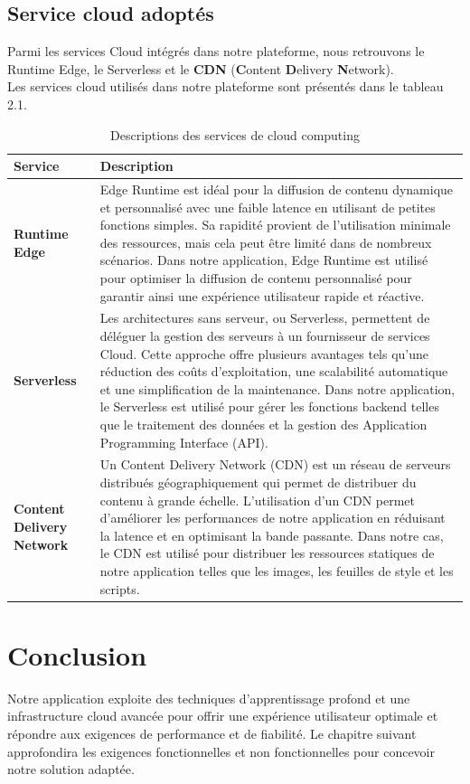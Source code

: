 \subsection{Service cloud adoptés }
\justifying
Parmi les services Cloud intégrés dans notre plateforme, nous retrouvons le Runtime Edge, le Serverless et le \textbf{CDN} (\textbf{C}ontent \textbf{D}elivery \textbf{N}etwork).\\
Les services cloud utilisés dans notre plateforme sont présentés dans le tableau 2.1.


\begin{table}[H]
    \centering
    \caption{Descriptions des services de cloud computing}
    \begin{tabular}{|>{\RaggedRight\arraybackslash}p{4cm}|>{\RaggedRight\arraybackslash}p{10cm}|}
        \hline
        \textbf{Service} & \textbf{Description} \\
        \hline
        \textbf{Runtime Edge} & Edge Runtime est idéal pour la diffusion de contenu dynamique et personnalisé avec une faible latence en utilisant de petites fonctions simples. Sa rapidité provient de l'utilisation minimale des ressources, mais cela peut être limité dans de nombreux scénarios. Dans notre application, Edge Runtime est utilisé pour optimiser la diffusion de contenu personnalisé pour garantir ainsi une expérience utilisateur rapide et réactive. \\
        \hline
        \textbf{Serverless} & Les architectures sans serveur, ou Serverless, permettent de déléguer la gestion des serveurs à un fournisseur de services Cloud. Cette approche offre plusieurs avantages tels qu'une réduction des coûts d'exploitation, une scalabilité automatique et une simplification de la maintenance. Dans notre application, le Serverless est utilisé pour gérer les fonctions backend telles que le traitement des données et la gestion des Application Programming Interface (API). \\
        \hline
        \textbf{Content Delivery Network} & Un Content Delivery Network (CDN) est un réseau de serveurs distribués géographiquement qui permet de distribuer du contenu à grande échelle. L'utilisation d'un CDN permet d'améliorer les performances de notre application en réduisant la latence et en optimisant la bande passante. Dans notre cas, le CDN est utilisé pour distribuer les ressources statiques de notre application telles que les images, les feuilles de style et les scripts. \\
        \hline
    \end{tabular}
    \label{table:cloud_services}
\end{table}

\section*{Conclusion}
\justifying
Notre application exploite des techniques d'apprentissage profond et une infrastructure cloud avancée pour offrir une expérience utilisateur optimale et répondre aux exigences de performance et de fiabilité. Le chapitre suivant approfondira les exigences fonctionnelles et non fonctionnelles pour concevoir notre solution adaptée.


